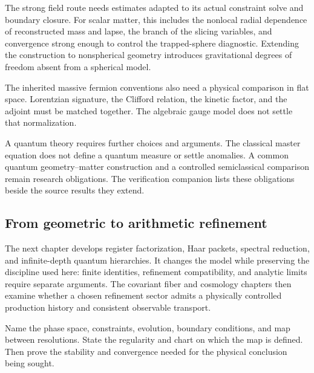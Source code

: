 The strong field route needs estimates adapted to its actual constraint solve and boundary closure. For scalar matter, this includes the nonlocal radial dependence of reconstructed mass and lapse, the branch of the slicing variables, and convergence strong enough to control the trapped-sphere diagnostic. Extending the construction to nonspherical geometry introduces gravitational degrees of freedom absent from a spherical model.

The inherited massive fermion conventions also need a physical comparison in flat space. Lorentzian signature, the Clifford relation, the kinetic factor, and the adjoint must be matched together. The algebraic gauge model does not settle that normalization.

A quantum theory requires further choices and arguments. The classical master equation does not define a quantum measure or settle anomalies. A common quantum geometry--matter construction and a controlled semiclassical comparison remain research obligations. The verification companion lists these obligations beside the source results they extend.

\subsection{From geometric to arithmetic refinement}
The next chapter develops register factorization, Haar packets, spectral reduction, and infinite-depth quantum hierarchies. It changes the model while preserving the discipline used here: finite identities, refinement compatibility, and analytic limits require separate arguments. The covariant fiber and cosmology chapters then examine whether a chosen refinement sector admits a physically controlled production history and consistent observable transport.

\begin{readerroadmap}[title={A concrete next comparison}]
Name the phase space, constraints, evolution, boundary conditions, and map between resolutions. State the regularity and chart on which the map is defined. Then prove the stability and convergence needed for the physical conclusion being sought.
\end{readerroadmap}
